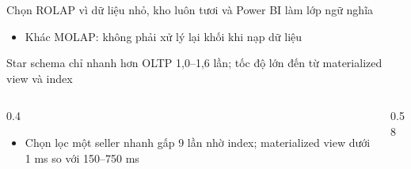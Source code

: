 \begin{frame}{Chọn ROLAP vì dữ liệu nhỏ, kho luôn tươi và Power BI làm lớp ngữ nghĩa}
\begin{itemize}
  \item Khác MOLAP: không phải xử lý lại khối khi nạp dữ liệu
\end{itemize}

\end{frame}

\begin{frame}{Star schema chỉ nhanh hơn OLTP 1,0–1,6 lần; tốc độ lớn đến từ materialized view và index}
\begin{columns}[T]\begin{column}{0.4\textwidth}
\begin{itemize}
  \item Chọn lọc một seller nhanh gấp 9 lần nhờ index; materialized view dưới 1 ms so với 150–750 ms
\end{itemize}
\end{column}\begin{column}{0.58\textwidth}
\begin{center}\end{center}
\end{column}\end{columns}

\end{frame}
